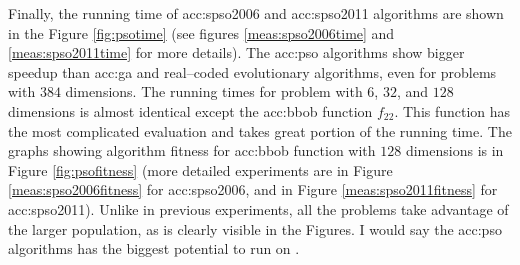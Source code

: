 Finally, the running time of \acrshort{acc:spso2006} and \acrshort{acc:spso2011} algorithms are shown in the Figure \ref{fig:psotime} (see figures \ref{meas:spso2006time} and \ref{meas:spso2011time} for more details). The \acrshort{acc:pso} algorithms show bigger speedup than \acrshort{acc:ga} and real--coded evolutionary algorithms, even for problems with $384$ dimensions. The running times for problem with $6$, $32$, and $128$ dimensions is almost identical except the \acrshort{acc:bbob} function $f_{22}$. This function has the most complicated evaluation and takes great portion of the running time. The graphs showing algorithm fitness for \acrshort{acc:bbob} function with $128$ dimensions is in Figure \ref{fig:psofitness} (more detailed experiments are in Figure \ref{meas:spso2006fitness} for \acrshort{acc:spso2006}, and in Figure \ref{meas:spso2011fitness} for \acrshort{acc:spso2011}). Unlike in previous experiments, all the problems take advantage of the larger population, as is clearly visible in the Figures. I would say the \acrshort{acc:pso} algorithms has the biggest potential to run on \gpuns.

